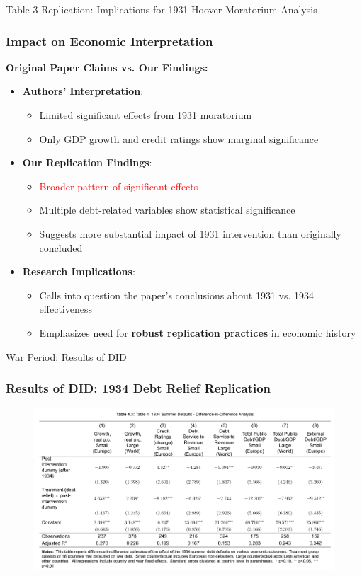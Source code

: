 \documentclass{beamer}
\begin{document}
\begin{frame}{Table 3 Replication: Implications for 1931 Hoover Moratorium Analysis}
  \frametitle{Impact on Economic Interpretation}
  \textbf{Original Paper Claims vs. Our Findings:}
  \begin{itemize}
    \item \textbf{Authors' Interpretation}:
    \begin{itemize}
        \item Limited significant effects from 1931 moratorium
        \item Only GDP growth and credit ratings show marginal significance
    \end{itemize}
    \item \textbf{Our Replication Findings}:
    \begin{itemize}
        \item \textcolor{red}{Broader pattern of significant effects}
        \item Multiple debt-related variables show statistical significance
        \item Suggests more substantial impact of 1931 intervention than originally concluded
    \end{itemize}
    \item \textbf{Research Implications}:
    \begin{itemize}
        \item \alert{Calls into question} the paper's conclusions about 1931 vs. 1934 effectiveness
        \item Emphasizes need for \textbf{robust replication practices} in economic history
    \end{itemize}
  \end{itemize}
\end{frame}

\begin{frame}{War Period: Results of DID}
  \frametitle{Results of DID: 1934 Debt Relief Replication}
  \begin{figure}[ht!]
      \centering
      \includegraphics[width=0.95\linewidth]{figures/tab4_rep.png}
      \label{fig:tab4_rep}
  \end{figure}  
\end{frame}
\end{document}
